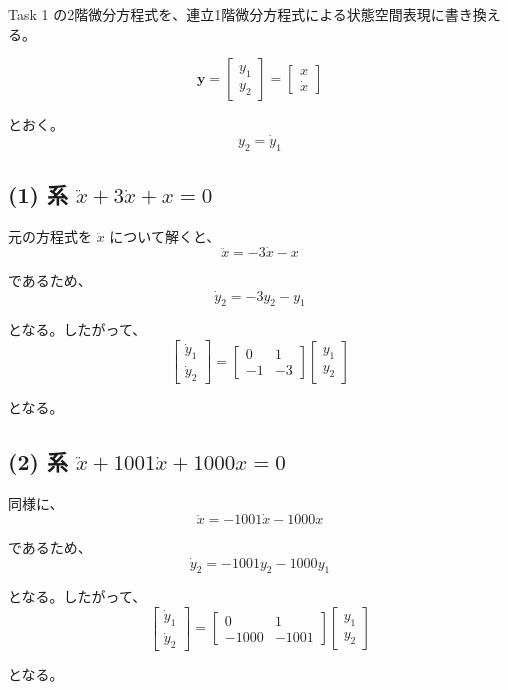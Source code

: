 \documentclass[11pt,a4paper]{jlreq}
\begin{document}
Task 1 の2階微分方程式を、連立1階微分方程式による状態空間表現に書き換える。

\[
\mathbf{y}=\begin{bmatrix}y_1\\y_2\end{bmatrix}
=\begin{bmatrix}x\\\dot{x}\end{bmatrix}
\]

とおく。
\[
y_2=\dot{y}_1
\]

\subsection*{(1) 系 \boldmath$\ddot{x}+3\dot{x}+x=0$\unboldmath}
元の方程式を $\ddot{x}$ について解くと、
\[
\ddot{x}=-3\dot{x}-x
\]

であるため、
\[
\dot{y}_2=-3y_2-y_1
\]

となる。したがって、
\[
\boxed{
\begin{bmatrix}\dot{y}_1\\\dot{y}_2\end{bmatrix}
=
\begin{bmatrix}0&1\\-1&-3\end{bmatrix}
\begin{bmatrix}y_1\\y_2\end{bmatrix}
}
\]

となる。

\subsection*{(2) 系 \boldmath$\ddot{x}+1001\dot{x}+1000x=0$\unboldmath}
同様に、
\[
\ddot{x}=-1001\dot{x}-1000x
\]

であるため、
\[
\dot{y}_2=-1001y_2-1000y_1
\]

となる。したがって、
\[
\boxed{
\begin{bmatrix}\dot{y}_1\\\dot{y}_2\end{bmatrix}
=
\begin{bmatrix}0&1\\-1000&-1001\end{bmatrix}
\begin{bmatrix}y_1\\y_2\end{bmatrix}
}
\]

となる。
\end{document}
